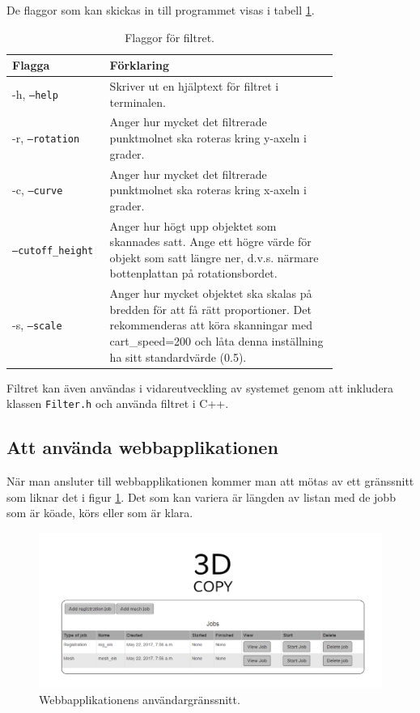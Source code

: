 \documentclass[a4paper,titlepage,12pt]{article}
\begin{document}
	De flaggor som kan skickas in till programmet visas i tabell \ref{tab:filter_flaggor}.
	
	\begin{table}[H]
		\centering
		\caption{Flaggor för filtret.}
		\label{tab:filter_flaggor}
		
		\begin{tabular}{p{0.2\linewidth}p{0.6\linewidth}}
			Flagga & Förklaring \\
			\hline
			-h, \texttt{--help} & Skriver ut en hjälptext för filtret i terminalen. \\
			\hline
			-r, \texttt{--rotation} & Anger hur mycket det filtrerade punktmolnet ska roteras kring y-axeln i grader. \\
			\hline
			-c, \texttt{--curve} & Anger hur mycket det filtrerade punktmolnet ska roteras kring x-axeln i grader. \\
			\hline
			\texttt{--cutoff\_height} & Anger hur högt upp objektet som skannades satt. Ange ett högre värde för objekt som satt längre ner, d.v.s. närmare bottenplattan på rotationsbordet. \\
			\hline
			-s, \texttt{--scale} & Anger hur mycket objektet ska skalas på bredden för att få rätt proportioner. Det rekommenderas att köra skanningar med cart\_speed=200 och låta denna inställning ha sitt standardvärde (0.5). \\
			\hline
		\end{tabular}
	
	\end{table}

	Filtret kan även användas i vidareutveckling av systemet genom att inkludera klassen \texttt{Filter.h} och använda filtret i C++.
	
	\subsection{Att använda webbapplikationen}
	
	När man ansluter till webbapplikationen kommer man att mötas av ett gränssnitt som liknar det i figur \ref{fig:web_gui}. Det som kan variera är längden av listan med de jobb som är köade, körs eller som är klara.
	
	\begin{figure}[H]
		\centering
		\includegraphics[width=160mm]{images/gui_web.PNG}
		\caption{Webbapplikationens användargränssnitt.}
		\label{fig:web_gui}
	\end{figure}
\end{document}
